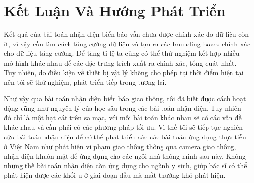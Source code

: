 \chapter{Kết Luận Và Hướng Phát Triển}
Kết quả của bài toán nhận diện biển báo vẫn chưa được chính xác do dữ liệu còn ít, vì vậy cần tìm cách tăng cường dữ liệu và tạo ra các bounding boxes chính xác cho dữ liệu tăng cường. Để tăng tỉ lệ ta cũng có thể thử nghiệm kết hợp nhiều mô hình khác nhau để các đặc trưng trích xuất ra chính xác, tổng quát nhất. Tuy nhiên, do điều kiện về thiết bị vật lý không cho phép tại thời điểm hiện tại nên tôi sẽ thử nghiệm, phát triển tiếp trong tương lai. \par
Như vậy qua bài toán nhận diện biển báo giao thông, tôi đã biết được cách hoạt động cũng như nguyên lý của học sâu trong các bài toán nhận diện. Tuy nhiên đó chỉ là một hạt cát trên sa mạc, với mỗi bài toán khác nhau sẽ có các vấn đề khác nhau và cần phải có các phương pháp tối ưu. Vì thế tôi sẽ tiếp tục nghiên cứu bài toán nhận diện để có thể phát triển các các bài toán ứng dụng thực tiễn ở Việt Nam như phát hiện vi phạm giao thông thông qua camera giao thông, nhận diện khuôn mặt để ứng dụng cho các ngôi nhà thông minh sau này. Không những thế bài toán nhận diện còn ứng dụng cho ngành y sinh, giúp bác sĩ có thể phát hiện được các khối u ở giai đoạn đầu mà mắt thường khó phát hiện.